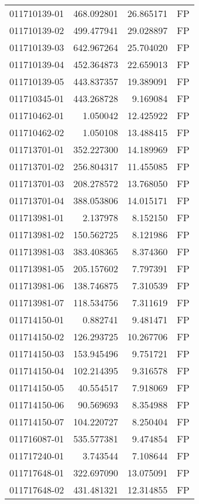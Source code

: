 \begin{tabular}{lrrl}
011710139-01 &  468.092801 &    26.865171 &   FP \\
011710139-02 &  499.477941 &    29.028897 &   FP \\
011710139-03 &  642.967264 &    25.704020 &   FP \\
011710139-04 &  452.364873 &    22.659013 &   FP \\
011710139-05 &  443.837357 &    19.389091 &   FP \\
011710345-01 &  443.268728 &     9.169084 &   FP \\
011710462-01 &    1.050042 &    12.425922 &   FP \\
011710462-02 &    1.050108 &    13.488415 &   FP \\
011713701-01 &  352.227300 &    14.189969 &   FP \\
011713701-02 &  256.804317 &    11.455085 &   FP \\
011713701-03 &  208.278572 &    13.768050 &   FP \\
011713701-04 &  388.053806 &    14.015171 &   FP \\
011713981-01 &    2.137978 &     8.152150 &   FP \\
011713981-02 &  150.562725 &     8.121986 &   FP \\
011713981-03 &  383.408365 &     8.374360 &   FP \\
011713981-05 &  205.157602 &     7.797391 &   FP \\
011713981-06 &  138.746875 &     7.310539 &   FP \\
011713981-07 &  118.534756 &     7.311619 &   FP \\
011714150-01 &    0.882741 &     9.481471 &   FP \\
011714150-02 &  126.293725 &    10.267706 &   FP \\
011714150-03 &  153.945496 &     9.751721 &   FP \\
011714150-04 &  102.214395 &     9.316578 &   FP \\
011714150-05 &   40.554517 &     7.918069 &   FP \\
011714150-06 &   90.569693 &     8.354988 &   FP \\
011714150-07 &  104.220727 &     8.250404 &   FP \\
011716087-01 &  535.577381 &     9.474854 &   FP \\
011717240-01 &    3.743544 &     7.108644 &   FP \\
011717648-01 &  322.697090 &    13.075091 &   FP \\
011717648-02 &  431.481321 &    12.314855 &   FP \\

\end{tabular}
